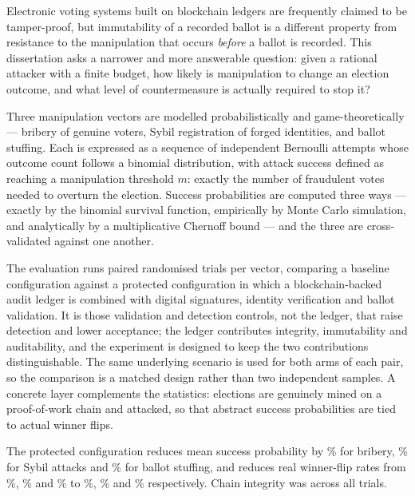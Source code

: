 \documentclass[11pt,a4paper]{article}
\begin{document}
Electronic voting systems built on blockchain ledgers are frequently claimed to be
tamper-proof, but immutability of a recorded ballot is a different property from
resistance to the manipulation that occurs \emph{before} a ballot is recorded. This
dissertation asks a narrower and more answerable question: given a rational attacker
with a finite budget, how likely is manipulation to change an election outcome, and
what level of countermeasure is actually required to stop it?

Three manipulation vectors are modelled probabilistically and game-theoretically ---
bribery of genuine voters, Sybil registration of forged identities, and ballot
stuffing. Each is expressed as a sequence of independent Bernoulli attempts whose
outcome count follows a binomial distribution, with attack success defined as reaching
a manipulation threshold $m$: exactly the number of fraudulent votes needed to overturn
the election. Success probabilities are computed three ways --- exactly by the binomial
survival function, empirically by Monte Carlo simulation, and analytically by a
multiplicative Chernoff bound --- and the three are cross-validated against one another.

The evaluation runs \TotalTrials{} paired randomised trials per vector, comparing a
baseline configuration against a protected configuration in which a blockchain-backed
audit ledger is combined with digital signatures, identity verification and ballot
validation. It is those validation and detection controls, not the ledger, that raise
detection and lower acceptance; the ledger contributes integrity, immutability and
auditability, and the experiment is designed to keep the two contributions
distinguishable. The same underlying scenario is used for both arms of each pair,
so the comparison is a matched design rather than two independent samples. A concrete
layer complements the statistics: \ElectionTrials{} elections are genuinely mined on a
proof-of-work chain and attacked, so that abstract success probabilities are tied to
actual winner flips.

The protected configuration reduces mean success probability by \BriberyRelReduction\%
for bribery, \SybilRelReduction\% for Sybil attacks and \BallotStuffingRelReduction\%
for ballot stuffing, and reduces real winner-flip rates from \FlipBriberyBaseline\%,
\FlipSybilBaseline\% and \FlipBallotStuffingBaseline\% to \FlipBriberyProtected\%,
\FlipSybilProtected\% and \FlipBallotStuffingProtected\% respectively. Chain integrity
was \ChainIntegrityHeld{} across all trials.
\end{document}
